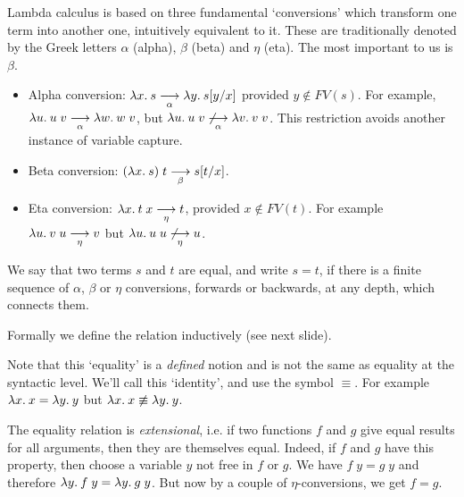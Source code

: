 \begin{slide*}


\vspace*{0.5cm}

Lambda calculus is based on three fundamental `conversions' which transform one
term into another one, intuitively equivalent to it. These are traditionally
denoted by the Greek letters {\green $\alpha$} (alpha), {\green $\beta$} (beta)
and {\green $\eta$} (eta). The most important to us is {\green $\beta$}.

\begin{itemize}

\item Alpha conversion: {\red $\lambda x.\: s \mathrel{\mathop{\longrightarrow}\limits_{\alpha}} \lambda y.\: s[y/x]$} provided
{\red $y \not\in FV(s)$}. For example, {\red $\lambda u.\: u\; v \mathrel{\mathop{\longrightarrow}\limits_{\alpha}} \lambda w.\:
w\; v$}, but {\red $\lambda u.\: u\; v \not\mathrel{\mathop{\longrightarrow}\limits_{\alpha}} \lambda v.\: v\; v$}. This
restriction avoids another instance of variable capture.

\item Beta conversion: {\red $(\lambda x.\: s)\; t \mathrel{\mathop{\longrightarrow}\limits_{\beta}} s[t/x]$}.

\item Eta conversion: {\red $\lambda x.\: t\; x \mathrel{\mathop{\longrightarrow}\limits_{\eta}} t$}, provided {\red $x
\not\in FV(t)$}. For example {\red $\lambda u.\: v\; u \mathrel{\mathop{\longrightarrow}\limits_{\eta}} v$} but {\red
$\lambda u.\: u\; u \not\mathrel{\mathop{\longrightarrow}\limits_{\eta}} u$}.

\end{itemize}

\end{slide*}



\begin{slide*}


\vspace*{0.5cm}

We say that two terms {\red $s$} and {\red $t$} are equal, and write {\red $s =
t$}, if there is a finite sequence of $\alpha$, $\beta$ or $\eta$ conversions,
forwards or backwards, at any depth, which connects them.

Formally we define the relation inductively (see next slide).

Note that this `equality' is a {\em defined} notion and is not the same as
equality at the syntactic level. We'll call this `identity', and use the symbol
{\red $\equiv$}. For example {\red $\lambda x.\: x = \lambda y.\: y$} but {\red
$\lambda x.\: x \not\equiv \lambda y.\: y$}.

The equality relation is {\em extensional}, i.e. if two functions {\red $f$}
and {\red $g$} give equal results for all arguments, then they are themselves
equal. Indeed, if {\red $f$} and {\red $g$} have this property, then choose a
variable {\red $y$} not free in {\red $f$} or {\red $g$}. We have {\red $f\; y
= g\; y$} and therefore {\red $\lambda y.\: f\; y = \lambda y.\: g\; y$}. But now by a
couple of $\eta$-conversions, we get {\red $f = g$}.

\end{slide*}




